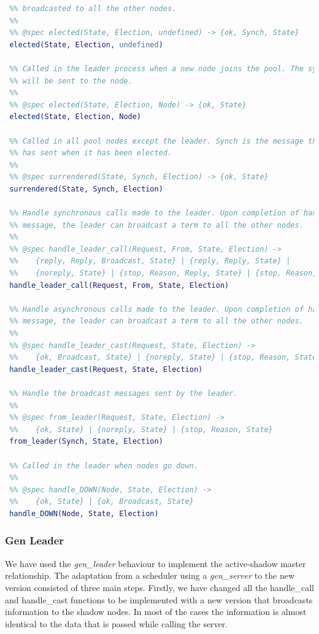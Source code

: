 \documentclass[11pt,a4paper,twoside]{report}
\begin{document}
\newpage
\begin{lstlisting}[language=Erlang,caption={gen\_leader behaviour},
label={lst:GLeader}]
 %% Called in the leader process when it is elected. The synch node will be
 %% broadcasted to all the other nodes.
 %%
 %% @spec elected(State, Election, undefined) -> {ok, Synch, State}
 elected(State, Election, undefined)

 %% Called in the leader process when a new node joins the pool. The synch node
 %% will be sent to the node.
 %%
 %% @spec elected(State, Election, Node) -> {ok, State}
 elected(State, Election, Node)

 %% Called in all pool nodes except the leader. Synch is the message the leader
 %% has sent when it has been elected.
 %%
 %% @spec surrendered(State, Synch, Election) -> {ok, State}
 surrendered(State, Synch, Election)

 %% Handle synchronous calls made to the leader. Upon completion of handling the
 %% message, the leader can broadcast a term to all the other nodes.
 %%
 %% @spec handle_leader_call(Request, From, State, Election) ->
 %%    {reply, Reply, Broadcast, State} | {reply, Reply, State} |
 %%    {noreply, State} | {stop, Reason, Reply, State} | {stop, Reason, State}
 handle_leader_call(Request, From, State, Election)

 %% Handle asynchronous calls made to the leader. Upon completion of handling the
 %% message, the leader can broadcast a term to all the other nodes.
 %%
 %% @spec handle_leader_cast(Request, State, Election) ->
 %%    {ok, Broadcast, State} | {noreply, State} | {stop, Reason, State}
 handle_leader_cast(Request, State, Election)

 %% Handle the broadcast messages sent by the leader.
 %%
 %% @spec from_leader(Request, State, Election) ->
 %%    {ok, State} | {noreply, State} | {stop, Reason, State}
 from_leader(Synch, State, Election)

 %% Called in the leader when nodes go down.
 %%
 %% @spec handle_DOWN(Node, State, Election) ->
 %%    {ok, State} | {ok, Broadcast, State}
 handle_DOWN(Node, State, Election)
\end{lstlisting}

\subsubsection{Gen Leader}
We have used the \textit{gen\_leader} behaviour to implement the active-shadow master relationship. The adaptation from a scheduler using a \textit{gen\_server} to the new version consisted of three main steps. Firstly, we have changed all the handle\_call and handle\_cast functions to be implemented with a new version that broadcasts information to the shadow nodes. In most of the cases the information is almost identical to the data that is passed while calling the server.
\end{document}
